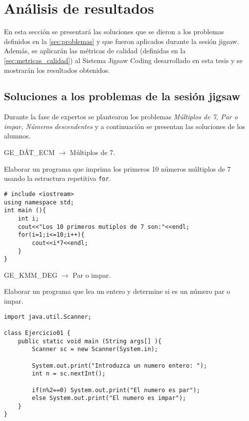 \chapter{Análisis de resultados}
\label{cap:analisis_de_resultados}
En esta sección se presentará las soluciones que se dieron a los problemas definidos en la \autoref{sec:problemas} y que fueron aplicados durante la sesión jigsaw. Además, se aplicarán las métricas de calidad (definidas en la \autoref{sec:metricas_calidad}) al Sistema Jigsaw Coding desarrollado en esta tesis y se mostrarán los resultados obtenidos.\\

\section{Soluciones a los problemas de la sesión jigsaw}
Durante la fase de expertos se plantearon los problemas \emph{Múltiplos de 7, Par o impar, Números descendentes} y a continuación se presentan las soluciones de los alumnos.

\begin{center}
	GE\_DÁT\_ECM $\longrightarrow$ Múltiplos de 7.
\end{center}

Elaborar un programa que imprima los primeros 10 números múltiplos de 7 usando la estructura repetitiva \texttt{for}.

\lstset{language=C, breaklines=true, basicstyle=\footnotesize}
\begin{lstlisting}
# include <iostream>
using namespace std;
int main (){
	int i;
	cout<<"Los 10 primeros mutiplos de 7 son:"<<endl;
	for(i=1;i<=10;i++){
		cout<<i*7<<endl;
	}
}
\end{lstlisting}
\clearpage
\begin{center}
	GE\_KMM\_DEG $\longrightarrow$ Par o impar.
\end{center}

Elaborar un programa que lea un entero y determine si es un número par o impar.

\lstset{language=Java, breaklines=true, basicstyle=\footnotesize}
\begin{lstlisting}
import java.util.Scanner;

class Ejercicio01 {
	public static void main (String args[] ){
		Scanner sc = new Scanner(System.in);

		System.out.print("Introduzca un numero entero: ");
		int n = sc.nextInt();

		if(n%2==0) System.out.print("El numero es par");
		else System.out.print("El numero es impar");
	}
}
\end{lstlisting}

